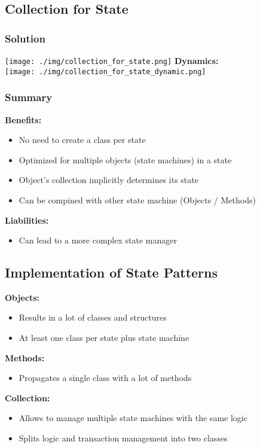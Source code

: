 \subsection{Collection for State}
\subsubsection{Solution}
\texttt{[image: ./img/collection\_for\_state.png]}
\textbf{Dynamics:}\\ 
\texttt{[image: ./img/collection\_for\_state\_dynamic.png]}
\subsubsection{Summary}
\textbf{Benefits:}
\begin{itemize}
    \item No need to create a class per state
    \item Optimized for multiple objects (state machines) in a state
    \item Object's collection implicitly determines its state
    \item Can be compined with other state machine (Objects / Methods)
\end{itemize}
\textbf{Liabilities:}
\begin{itemize}
    \item Can lead to a more complex state manager
\end{itemize}

\subsection{Implementation of State Patterns}
\textbf{Objects:} 
\begin{itemize}
    \item Results in a lot of classes and structures
    \item At least one class per state plus state machine
\end{itemize}
\textbf{Methods:}
\begin{itemize}
    \item Propagates a single class with a lot of methods
\end{itemize}
\textbf{Collection:}
\begin{itemize}
    \item Allows to manage multiple state machines with the same logic
    \item Splits logic and transaction management into two classes
\end{itemize}
